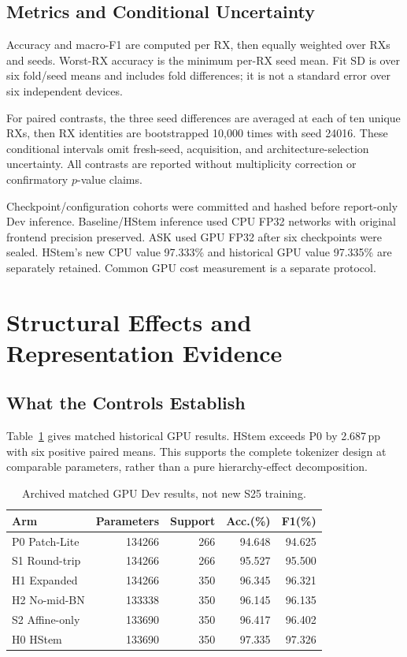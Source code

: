 \documentclass[journal]{IEEEtran}
\begin{document}
\subsection{Metrics and Conditional Uncertainty}
Accuracy and macro-F1 are computed per RX, then equally weighted over RXs and seeds. Worst-RX accuracy is the minimum per-RX seed mean. Fit SD is over six fold/seed means and includes fold differences; it is not a standard error over six independent devices.

For paired contrasts, the three seed differences are averaged at each of ten unique RXs, then RX identities are bootstrapped 10,000 times with seed 24016. These conditional intervals omit fresh-seed, acquisition, and architecture-selection uncertainty. All contrasts are reported without multiplicity correction or confirmatory $p$-value claims.

Checkpoint/configuration cohorts were committed and hashed before report-only Dev inference. Baseline/HStem inference used CPU FP32 networks with original frontend precision preserved. ASK used GPU FP32 after six checkpoints were sealed. HStem's new CPU value 97.333\% and historical GPU value 97.335\% are separately retained. Common GPU cost measurement is a separate protocol.

\section{Structural Effects and Representation Evidence}
\subsection{What the Controls Establish}
Table~\ref{tab:ablations} gives matched historical GPU results. HStem exceeds P0 by 2.687\,pp with six positive paired means. This supports the complete tokenizer design at comparable parameters, rather than a pure hierarchy-effect decomposition.

\begin{table}[t]\centering
\caption{Archived matched GPU Dev results, not new S25 training.}
\label{tab:ablations}
\begin{tabular}{lrrrr}\toprule
Arm & Parameters & Support & Acc.(\%) & F1(\%)\\\midrule
P0 Patch-Lite &134266&266&94.648&94.625\\
S1 Round-trip &134266&266&95.527&95.500\\
H1 Expanded &134266&350&96.345&96.321\\
H2 No-mid-BN &133338&350&96.145&96.135\\
S2 Affine-only &133690&350&96.417&96.402\\
H0 HStem &133690&350&97.335&97.326\\\bottomrule
\end{tabular}
\end{table}
\end{document}
